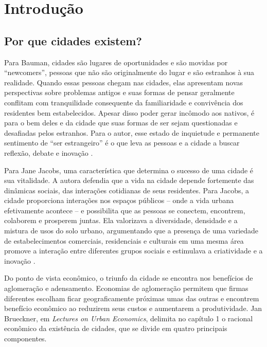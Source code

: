 



\chapter{Introdução}

\section{Por que cidades existem?}

Para Bauman, cidades são lugares de oportunidades e são movidas por ``newcomers'', pessoas que não são originalmente do lugar e são estranhos à sua realidade. Quando essas pessoas chegam nas cidades, elas apresentam novas perspectivas sobre problemas antigos e suas formas de pensar geralmente conflitam com tranquilidade consequente da familiaridade e convivência dos residentes bem estabelecidos. Apesar disso poder gerar incômodo aos nativos, é para o bem deles e da cidade que suas formas de ser sejam questionadas e desafiadas pelos estranhos. Para o autor, esse estado de inquietude e permanente sentimento de ``ser estrangeiro'' é o que leva as pessoas e a cidade a buscar reflexão, debate e inovação \cite{bauman2003city}.

Para Jane Jacobs, uma característica que determina o sucesso de uma cidade é sua vitalidade. A autora defendia que a vida na cidade depende fortemente das dinâmicas sociais, das interações cotidianas de seus residentes. Para Jacobs, a cidade proporciona interações nos espaços públicos -- onde a vida urbana efetivamente acontece -- e possibilita que as pessoas se conectem, encontrem, colaborem e prosperem juntas. Ela valorizava a diversidade, densidade e a mistura de usos do solo urbano, argumentando que a presença de uma variedade de estabelecimentos comerciais, residenciais e culturais em uma mesma área promove a interação entre diferentes grupos sociais e estimulava a criatividade e a inovação \cite{jacobs1961death}.

Do ponto de vista econômico, o triunfo da cidade se encontra nos benefícios de aglomeração e adensamento. Economias de aglomeração permitem que firmas diferentes escolham ficar geograficamente próximas umas das outras e encontrem benefício econômico ao reduzirem seus custos e aumentarem a produtividade. Jan Brueckner, em \textit{Lectures on Urban Economics}, delimita no capítulo 1 o racional econômico da existência de cidades, que se divide em quatro principais componentes.

